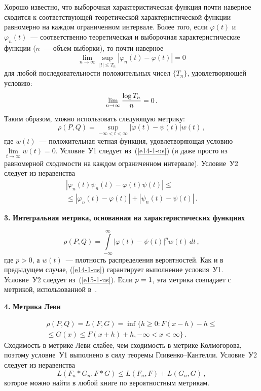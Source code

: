 \begin{multicols}{2}
Хорошо известно, что выборочная характеристическая функция
почти наверное сходится к соответствующей теоретической характеристической
функции равномерно на каждом ограниченном интервале. Более того,
если $\varphi(t)$
и $\varphi_n(t)$~--- соответственно теоретическая и выборочная
характеристические функции ($n$~--- объем выборки), то почти наверное
\begin{equation}
\lim\limits_{n\to\infty}\sup_{|t|\le T_n}|\varphi_n(t)-\varphi(t)|=0\label{e14-1-us}
\end{equation}
для любой последовательности положительных чисел $\{T_n\}$, удовлетворяющей
условию:
$$
\lim\limits_{n\to\infty}\displaystyle\frac{\displaystyle \log T_n\mathstrut}{\displaystyle n\mathstrut}=0\,.
$$
Таким образом, можно использовать следующую метрику:
$$
\rho(P,Q)=\sup_{-\infty<t<\infty}|\varphi(t)-\psi(t)|w(t)\,,
$$
где $w(t)$~--- положительная четная функция, удовлетворяющая условию
$\lim\limits_{t\to\infty}w(t)=0$. Условие~У1 следует из~(\ref{e14-1-us}) (и даже просто из
равномерной сходимости на каждом ограниченном интервале).
Условие~У2 следует из неравенства
\begin{multline}
|\varphi_n(t)\psi_n(t)-\varphi(t)\psi(t)|\le{}\\
{}\le
|\varphi_n(t)-\varphi(t)|+|\psi_n(t)-\psi(t)|\,.\label{e15-1-us}
\end{multline}

\smallskip
\textbf{3.} \textbf{Интегральная метрика, основанная на характеристических
функциях}


$$
\rho(P,Q)=\int\limits_{-\infty}^\infty|\varphi(t)-\psi(t)|^pw(t)\,dt\,,
$$
где $p>0$, а $w(t)$~--- плотность распределения вероятностей. Как и в
предыдущем случае, (\ref{e14-1-us}) гарантирует выполнение условия~У1. Условие~У2 
следует из~(\ref{e15-1-us}). Если $p\hm=1$, эта метрика совпадает с метрикой,
использованной в~\cite{2-us}.

\smallskip
\textbf{4.} \textbf{Метрика Леви}


\begin{multline*}
\rho(P,Q)=L(F,G)=
\inf\{h\ge0:F(x-h)-h\le{}\\
{}\le G(x)\le F(x+h)+h,-\infty<x<\infty\}\,.
\end{multline*}
Сходимость в метрике Леви слабее, чем сходимость в метрике
Колмогорова, поэтому условие~У1 выполнено в силу теоремы
Гли\-вен\-ко--Кан\-тел\-ли. Условие~У2 следует из неравенства
$$
L(F_n\ast G_n,F\ast G)\le L(F_n,F)+L(G_n,G)\,,
$$
которое можно найти в любой книге по вероятностным метрикам.

{\small\frenchspacing
{%
\begin{thebibliography}{9}


\end{thebibliography}}}
\end{multicols}
